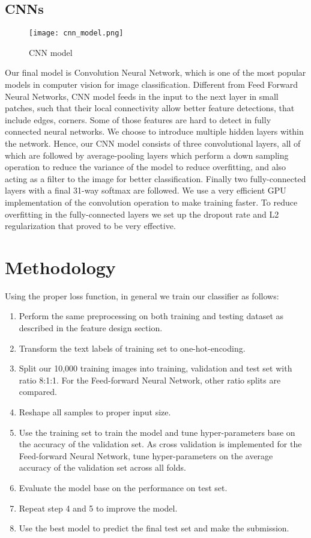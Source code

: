 \documentclass[conference]{IEEEtran}
\begin{document}
\subsection{CNNs}
\begin{figure}[!htbp]
\centering
\texttt{[image: cnn\_model.png]}
\caption{CNN model}
\end{figure}
Our final model is Convolution Neural Network, which is one of
the most popular models in computer vision for image classification. Different from Feed Forward Neural Networks, CNN model feeds in the input to the next layer in small patches, such that their local connectivity allow better feature detections, that include edges, corners. Some of those features are hard to detect in fully connected neural networks.
We choose to introduce multiple hidden layers within the
network. Hence, our CNN model consists of three convolutional layers, all of which are followed by average-pooling layers which perform a down sampling operation to reduce the variance of the model to reduce overfitting, and also acting as a filter to the image for better classification. \cite{cs231n} Finally two fully-connected layers with a final 31-way softmax are followed. We use a very efficient GPU implementation of the convolution operation to make training faster. To reduce overfitting in the fully-connected layers we set up the dropout rate and L2 regularization that proved to be very effective.

\section{Methodology}
Using the proper loss function, in general we train our classifier as follows:
\begin{enumerate}
    \item Perform the same preprocessing on both training and testing dataset as described in the feature design section. 
    \item Transform the text labels of training set to one-hot-encoding.
    \item Split our 10,000 training images into training, validation and test set with ratio 8:1:1. For the Feed-forward Neural Network, other ratio splits are compared.
    \item Reshape all samples to proper input size. 
    \item Use the training set to train the model and tune hyper-parameters base on the accuracy of the validation set. As cross validation is implemented for the Feed-forward Neural Network, tune hyper-parameters on the average accuracy of the validation set across all folds. 
    \item Evaluate the model base on the performance on test set. 
    \item Repeat step 4 and 5 to improve the model.
    \item Use the best model to predict the final test set and make the submission.
\end{enumerate}
\end{document}
